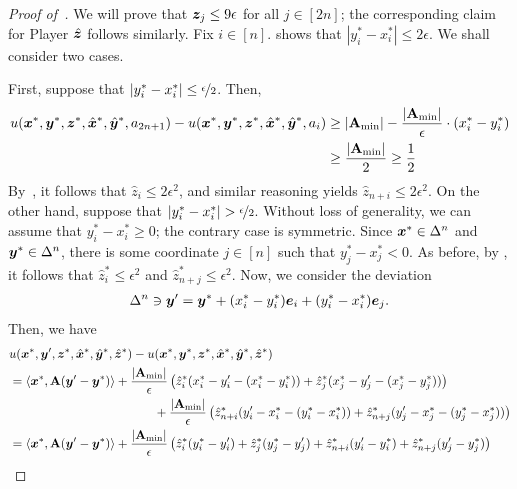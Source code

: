 \begin{proof}[Proof of~]
    We will prove that ${\bm{z}}_j \leq 9 \epsilon$ for all $j \in [2n]$; the corresponding claim for Player $\hat{{\bm{z}}}$ follows similarly. Fix $i \in [n]$.  shows that $|y_i^* - x_i^* | \leq 2 \epsilon$. We shall consider two cases.

    First, suppose that $|y_i^* - x_i^*| \leq \nicefrac{\epsilon}{2}$. Then,
    \begin{align*}
        u({\bm{x}}^*, {\bm{y}}^*, {\bm{z}}^*, \hat{{\bm{x}}}^*, \hat{{\bm{y}}}^*, a_{2n + 1}) - u({\bm{x}}^*, {\bm{y}}^*, {\bm{z}}^*, \hat{{\bm{x}}}^*, \hat{{\bm{y}}}^*, a_i) &\geq |\mathbf{A}_{\min}| - \frac{|\mathbf{A}_{\min}|}{\epsilon} \cdot (x^*_i - y^*_i)\\
        & \geq \frac{|\mathbf{A}_{\min}|}{2} \geq \frac{1}{2}
    \end{align*}
    By~, it follows that $\hat{z}_i \leq 2 \epsilon^2$, and similar reasoning yields $\hat{z}_{n + i} \leq 2 \epsilon^2$. On the other hand, suppose that $|y_i^* - x_i^*| > \nicefrac{\epsilon}{2}$. Without loss of generality, we can assume that $y_i^* - x_i^* \geq 0$; the contrary case is symmetric. Since ${\bm{x}}^* \in \Delta^n$ and ${\bm{y}}^* \in \Delta^n$, there is some coordinate $j \in [n]$ such that $y^*_j - x^*_j < 0$. As before, by , it follows that $\hat{z}^*_i \leq \epsilon^2$ and $\hat{z}^*_{n + j} \leq \epsilon^2$. Now, we consider the deviation
    \begin{align*}
        \Delta^n \ni {\bm{y}}' = {\bm{y}}^* + (x_i^* - y_i^*) {\bm{e}}_i + (y_i^* - x^*_i) {\bm{e}}_j.
    \end{align*}
    Then, we have
    \begin{align*}
        &u(\vx^*, \vy', \vz^*, \hat{\vx}^*, \hat{\vy}^*, \hat{\vz}^*) - u(\vx^*, \vy^*, \vz^*, \hat{\vx}^*, \hat{\vy}^*, \hat{\vz}^*)  \\ 
        &=  \langle \vx^*, \mat{A} (\vy' - \vy^*) \rangle + \frac{|\Amin|}{\epsilon} \left(\hat{z}^*_i (x^*_i - y'_i - (x^*_i - y^*_i)) + \hat{z}^*_j(x^*_j - y'_j - (x^*_j - y^*_j)) \right) \\
        &\phantom{===============} + \frac{|\mat{A}_{\min}|}{\epsilon} \left(\hat{z}^*_{n+i} ( y'_{i} -x^*_{i} - (y^*_{i} - x^*_{i})) + \hat{z}^*_{n+j}(y'_{j} - x^*_{j} - (y^*_{j} - x^*_{j})) \right) \\
        &= \langle \vx^*, \mat{A} (\vy' - \vy^*) \rangle + \frac{|\Amin|}{\epsilon} \left(\hat{z}^*_i (y_i^* - y'_i) + \hat{z}^*_j (y^*_j - y'_j) + \hat{z}^*_{n + i} (y'_{i} - y^*_{i})  + \hat{z}^*_{n + j} (y'_{ j} - y^*_{j})\right) \\

\end{align*}
\end{proof}
